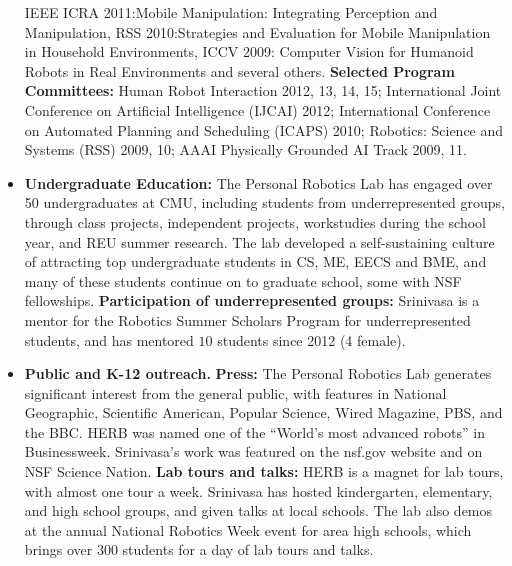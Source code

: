 \documentclass[10pt]{article}
\begin{document}
\begin{itemize}
IEEE ICRA 2011:Mobile Manipulation: Integrating Perception and Manipulation, 
RSS 2010:Strategies and Evaluation for Mobile Manipulation in Household Environments,
ICCV 2009: Computer Vision for Humanoid Robots in Real Environments
and several others.
\textbf{Selected Program Committees:} 
Human Robot Interaction 2012, 13, 14, 15;
International Joint Conference on Artificial Intelligence (IJCAI) 2012;
International Conference on Automated Planning and Scheduling (ICAPS) 2010;
Robotics: Science and Systems (RSS) 2009, 10; 
AAAI Physically Grounded AI Track 2009, 11.
\item \textbf{Undergraduate Education:}
 The Personal Robotics Lab has engaged over 50 undergraduates at CMU, including students from underrepresented groups, through class projects, independent projects, workstudies during the school year, and REU summer research.  The lab developed a self-sustaining culture of attracting top undergraduate students in CS, ME, EECS and BME, and many of these students continue on to graduate school, some with NSF fellowships. 
 \textbf{Participation of underrepresented groups:}  Srinivasa is a mentor for the Robotics Summer Scholars Program for underrepresented students, and has mentored $10$ students since 2012 (4 female).
\item  \textbf{Public and K-12 outreach.} \textbf{Press:}
The Personal Robotics Lab generates significant interest from the general public, with features in National Geographic, Scientific American, Popular Science, Wired Magazine, PBS, and the BBC. HERB was named one of the ``World's most advanced robots'' in Businessweek. Srinivasa's work was featured on the nsf.gov website and on NSF Science Nation.    
 \textbf{Lab tours and talks:}
  HERB is a magnet for lab tours, with almost one tour a week. Srinivasa has hosted kindergarten, elementary, and high school groups, and given talks at local schools. The lab also demos at the annual National Robotics Week event for area high schools, which brings over 300 students for a day of lab tours and talks.
\end{itemize}

\newpage
 

\end{document}

